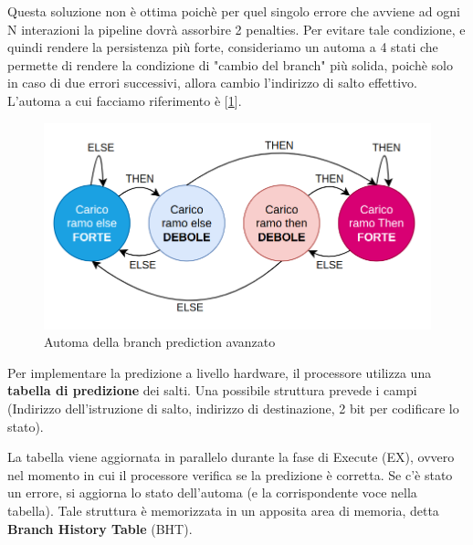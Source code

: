 Questa soluzione non è ottima poichè per quel singolo errore che avviene ad ogni N interazioni la pipeline dovrà assorbire 2 penalties. Per evitare tale condizione, e quindi rendere la persistenza più forte, consideriamo un automa a 4 stati che permette di rendere la condizione di "cambio del branch" più solida, poichè solo in caso di due errori successivi, allora cambio l'indirizzo di salto effettivo. L'automa a cui facciamo riferimento è [\ref{img:automa-complesso}].

\begin{figure}[ht]
    \centering
    \includegraphics[width=.5\textwidth]{fig/chapter_1/automa-complesso.png}
    \caption{Automa della branch prediction avanzato}\label{img:automa-complesso}
\end{figure}

\noindent Per implementare la predizione a livello hardware, il processore utilizza una \textbf{tabella di predizione} dei salti. Una possibile struttura prevede i campi (Indirizzo dell'istruzione di salto, indirizzo di destinazione, 2 bit per codificare lo stato).

\noindent La tabella viene aggiornata in parallelo durante la fase di Execute (EX), ovvero nel momento in cui il processore verifica se la predizione è corretta. Se c'è stato un errore, si aggiorna lo stato dell'automa (e la corrispondente voce nella tabella). Tale struttura è memorizzata in un apposita area di memoria, detta \textbf{Branch History Table} (BHT).

